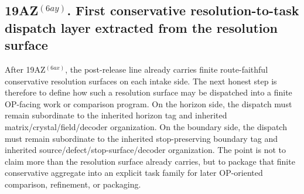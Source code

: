 \subsection*{19AZ$^{(6ay)}$. First conservative resolution-to-task dispatch layer extracted from the resolution surface}
\label{sec:first-conservative-resolution-to-task-dispatch-layer-extracted-from-the-resolution-surface}
After 19AZ$^{(6ax)}$, the post-release line already carries finite route-faithful conservative resolution surfaces on each intake side. The next honest step is therefore to define how such a resolution surface may be dispatched into a finite OP-facing work or comparison program. On the horizon side, the dispatch must remain subordinate to the inherited horizon tag and inherited matrix/crystal/field/decoder organization. On the boundary side, the dispatch must remain subordinate to the inherited stop-preserving boundary tag and inherited source/defect/stop-surface/decoder organization. The point is not to claim more than the resolution surface already carries, but to package that finite conservative aggregate into an explicit task family for later OP-oriented comparison, refinement, or packaging.

